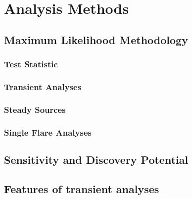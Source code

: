\chapter{Analysis Methods}
\label{sec:nusources}



\section{Maximum Likelihood Methodology}
\label{sec:nusources:lieklihood}


\subsection{Test Statistic}
\label{sec:nusources:TS}


\subsection{Transient Analyses}
\label{sec:nusources:transient}

\subsection{Steady Sources}
\label{sec:nusources:steady}

\subsection{Single Flare Analyses}
\label{sec:nusources:flare}

\section{Sensitivity and Discovery Potential}
\label{sec:sensitivity}


\section{Features of transient analyses}
\label{sec:transient_dip}


